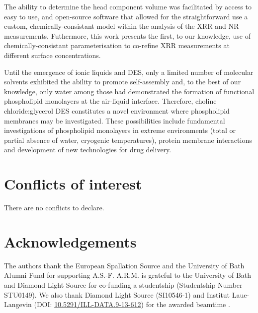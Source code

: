 \documentclass[twoside,twocolumn,9pt]{article}
\renewcommand{\refname}{Notes and references}
\begin{document}
The ability to determine the head component volume was facilitated by access to easy to use, and open-source software that allowed for the straightforward use a custom, chemically-consistant model within the analysis of the XRR and NR measurements. Futhermore, this work presents the first, to our knowledge, use of chemically-consistant parameterisation to co-refine XRR measurements at different surface concentrations.

Until the emergence of ionic liquids and DES, only a limited number of molecular solvents exhibited the ability to promote self-assembly and, to the best of our knowledge, only water among those had demonstrated the formation of functional phospholipid monolayers at the air-liquid interface. Therefore, choline chloride:glycerol DES constitutes a novel environment where phospholipid membranes may be investigated. These possibilities include fundamental investigations of phospholipid monolayers in extreme environments (total or partial absence of water, cryogenic temperatures), protein membrane interactions and development of new technologies for drug delivery.

\section*{Conflicts of interest}
There are no conflicts to declare.

\section*{Acknowledgements}
The authors thank the European Spallation Source and the University of Bath Alumni Fund for supporting A.S.-F. A.R.M. is grateful to the University of Bath and Diamond Light Source for co-funding a studentship (Studentship Number STU0149). We also thank Diamond Light Source (SI10546-1) and Institut Laue-Langevin (DOI: \href{http://doi.org/10.5291/ILL-DATA.9-13-612}{10.5291/ILL-DATA.9-13-612}) for the awarded beamtime .



\balance


\end{document}
